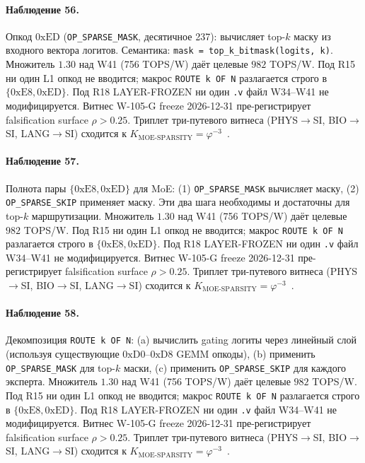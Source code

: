 \paragraph{Наблюдение 56.} Опкод $0\mathrm{xED}$ (\texttt{OP\_SPARSE\_MASK}, десятичное 237): вычисляет top-$k$ маску из входного вектора логитов. Семантика: \texttt{mask = top\_k\_bitmask(logits, k)}. Множитель $1{.}30$ над W41 (756 TOPS/W) даёт целевые $982$ TOPS/W. Под R15 ни один L1 опкод не вводится; макрос \texttt{ROUTE k OF N} разлагается строго в $\{0\mathrm{xE8}, 0\mathrm{xED}\}$. Под R18 LAYER-FROZEN ни один \texttt{.v} файл W34--W41 не модифицируется. Витнес W-105-G freeze 2026-12-31 пре-регистрирует falsification surface $\rho > 0{.}25$. Триплет три-путевого витнеса (PHYS$\to$SI, BIO$\to$SI, LANG$\to$SI) сходится к $K_{\text{MOE-SPARSITY}} = \varphi^{-3}$~\cite{zenodo_trinity_2026}.

\paragraph{Наблюдение 57.} Полнота пары $\{0\mathrm{xE8}, 0\mathrm{xED}\}$ для MoE: (1) \texttt{OP\_SPARSE\_MASK} вычисляет маску, (2) \texttt{OP\_SPARSE\_SKIP} применяет маску. Эти два шага необходимы и достаточны для top-$k$ маршрутизации. Множитель $1{.}30$ над W41 (756 TOPS/W) даёт целевые $982$ TOPS/W. Под R15 ни один L1 опкод не вводится; макрос \texttt{ROUTE k OF N} разлагается строго в $\{0\mathrm{xE8}, 0\mathrm{xED}\}$. Под R18 LAYER-FROZEN ни один \texttt{.v} файл W34--W41 не модифицируется. Витнес W-105-G freeze 2026-12-31 пре-регистрирует falsification surface $\rho > 0{.}25$. Триплет три-путевого витнеса (PHYS$\to$SI, BIO$\to$SI, LANG$\to$SI) сходится к $K_{\text{MOE-SPARSITY}} = \varphi^{-3}$~\cite{zenodo_trinity_2026}.

\paragraph{Наблюдение 58.} Декомпозиция \texttt{ROUTE k OF N}: (a) вычислить gating логиты через линейный слой (используя существующие $0\mathrm{xD0}$--$0\mathrm{xD8}$ GEMM опкоды), (b) применить \texttt{OP\_SPARSE\_MASK} для top-$k$ маски, (c) применить \texttt{OP\_SPARSE\_SKIP} для каждого эксперта. Множитель $1{.}30$ над W41 (756 TOPS/W) даёт целевые $982$ TOPS/W. Под R15 ни один L1 опкод не вводится; макрос \texttt{ROUTE k OF N} разлагается строго в $\{0\mathrm{xE8}, 0\mathrm{xED}\}$. Под R18 LAYER-FROZEN ни один \texttt{.v} файл W34--W41 не модифицируется. Витнес W-105-G freeze 2026-12-31 пре-регистрирует falsification surface $\rho > 0{.}25$. Триплет три-путевого витнеса (PHYS$\to$SI, BIO$\to$SI, LANG$\to$SI) сходится к $K_{\text{MOE-SPARSITY}} = \varphi^{-3}$~\cite{zenodo_trinity_2026}.

